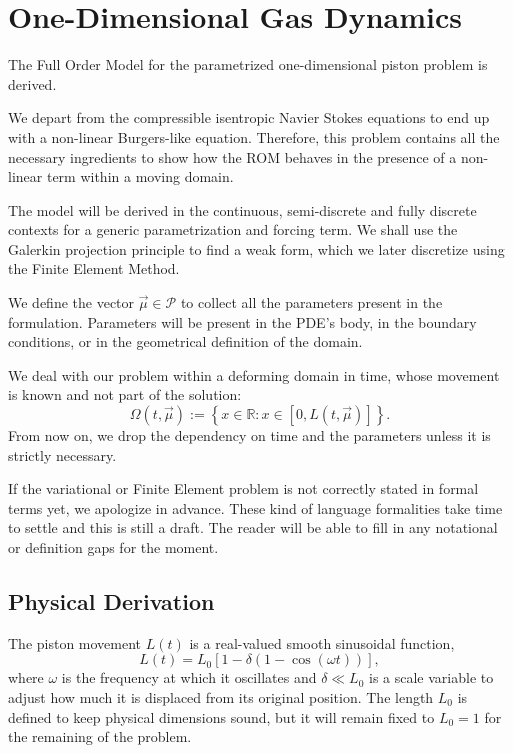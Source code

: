 \documentclass[../../thesis.tex]{subfiles}
\begin{document}
\section{One-Dimensional Gas Dynamics}
\label{sec:1d_fom_heat_equation_full_order_model}
The Full Order Model for the parametrized one-dimensional piston problem is derived.

We depart from the compressible isentropic Navier Stokes equations to end up with a non-linear Burgers-like equation.
Therefore, this problem contains all the necessary ingredients to show how the ROM behaves 
in the presence of a non-linear term within a moving domain.

The model will be derived in the continuous, semi-discrete and fully discrete contexts for a generic parametrization and forcing term.
We shall use the Galerkin projection principle to find a weak form, which we later discretize using the Finite Element Method. 

We define the vector $\vec{\mu} \in \mathcal{P}$ to collect all the parameters present in the formulation.
Parameters will be present in the PDE's body, in the boundary conditions, or in the geometrical definition of the domain. 

We deal with our problem within a deforming domain in time, whose movement is known and not part of the solution:
\begin{equation*}
    \Omega(t, \vec{\mu}) := \left\{x \in \mathbb{R} : x \in \left[0, L(t, \vec{\mu})\right]\right\}.
\end{equation*}
From now on, we drop the dependency on time and the parameters unless it is strictly necessary. 

If the variational or Finite Element problem is not correctly stated in formal terms yet, we apologize in advance.
These kind of language formalities take time to settle and this is still a draft. 
The reader will be able to fill in any notational or definition gaps for the moment. 

\subsection{Physical Derivation}
The piston movement $L(t)$ is a real-valued smooth sinusoidal function,
\begin{equation}
    L(t) = L_0 \left[1 - \delta \left(1 - \cos \left(\omega t\right)\right)\right],
\end{equation}
where $\omega$ is the frequency at which it oscillates and $\delta \ll L_0$ is a scale variable to adjust how much it is displaced from its original position.
The length $L_0$ is defined to keep physical dimensions sound, but it will remain fixed to $L_0=1$ for the remaining of the problem.
\end{document}

